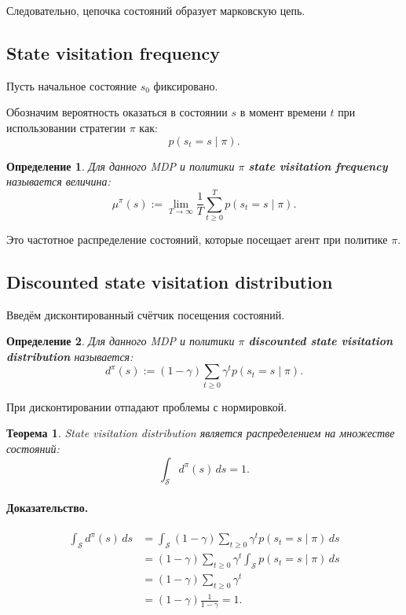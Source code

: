 \documentclass[12pt,a4paper]{article}
\newtheorem{theorem}{Теорема}
\newtheorem{definition}{Определение}
\begin{document}
Следовательно, цепочка состояний образует марковскую цепь.

\subsection{State visitation frequency}

Пусть начальное состояние $s_0$ фиксировано.

Обозначим вероятность оказаться в состоянии $s$ в момент времени $t$ при использовании стратегии $\pi$ как:
\[
p(s_t=s\mid \pi).
\]

\begin{definition}
Для данного MDP и политики $\pi$ \textbf{state visitation frequency} называется величина:
\[
\mu^\pi(s)
:=
\lim_{T\to\infty}
\frac{1}{T}
\sum_{t\ge 0}^{T}
p(s_t=s\mid \pi).
\]
\end{definition}

Это частотное распределение состояний, которые посещает агент при политике $\pi$.

\subsection{Discounted state visitation distribution}

Введём дисконтированный счётчик посещения состояний.

\begin{definition}
Для данного MDP и политики $\pi$ \textbf{discounted state visitation distribution} называется:
\[
d^\pi(s)
:=
(1-\gamma)
\sum_{t\ge 0}
\gamma^t
p(s_t=s\mid \pi).
\]
\end{definition}

При дисконтировании отпадают проблемы с нормировкой.

\begin{theorem}
State visitation distribution является распределением на множестве состояний:
\[
\int_{\mathcal S}
d^\pi(s)
\,ds
=
1.
\]
\end{theorem}

\paragraph{Доказательство.}

\[
\begin{aligned}
\int_{\mathcal S}
d^\pi(s)
\,ds
&=
\int_{\mathcal S}
(1-\gamma)
\sum_{t\ge 0}
\gamma^t
p(s_t=s\mid \pi)
\,ds
\\
&=
(1-\gamma)
\sum_{t\ge 0}
\gamma^t
\int_{\mathcal S}
p(s_t=s\mid \pi)
\,ds
\\
&=
(1-\gamma)
\sum_{t\ge 0}
\gamma^t
\\
&=
(1-\gamma)
\frac{1}{1-\gamma}
=
1.
\end{aligned}
\]
\end{document}
